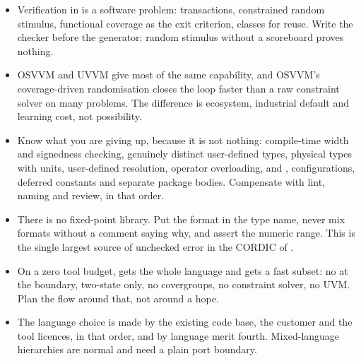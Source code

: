 \begin{itemize}
  run in that time slot.
\item Verification in \SV{} is a software problem: transactions, constrained
  random stimulus, functional coverage as the exit criterion, classes for
  reuse. Write the checker before the generator: random stimulus without a
  scoreboard proves nothing.
\item OSVVM and UVVM give \VHDL{} most of the same capability, and OSVVM's
  coverage-driven randomisation closes the loop faster than a raw constraint
  solver on many problems. The difference is ecosystem, industrial default and
  learning cost, not possibility.
\item Know what you are giving up, because it is not nothing: compile-time
  width and signedness checking, genuinely distinct user-defined types,
  physical types with units, user-defined resolution, operator overloading,
   and , configurations, deferred constants
  and separate package bodies. Compensate with lint, naming and review, in that
  order.
\item There is no \SV{} fixed-point library. Put the format in the type name,
  never mix formats without a comment saying why, and assert the numeric
  range. This is the single largest source of unchecked error in the CORDIC of
  .
\item On a zero tool budget, \VHDL{} gets the whole language and \SV{} gets a
  fast subset: no \VHDL{} at the boundary, two-state only, no covergroups, no
  constraint solver, no UVM. Plan the flow around that, not around a hope.
\item The language choice is made by the existing code base, the customer and
  the tool licences, in that order, and by language merit fourth. Mixed-language
  hierarchies are normal and need a plain port boundary.
\end{itemize}
